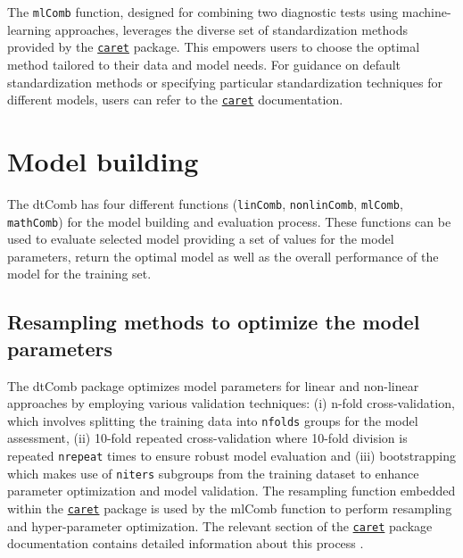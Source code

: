 \documentclass[10pt]{article}
\newcommand{\CRANpkg}[1]{\href{https://CRAN.R-project.org/package=#1}{\texttt{#1}}}
\newcommand{\Rfunction}[1]{\texttt{#1}}
\begin{document}
The \Rfunction{mlComb} function, designed for combining two diagnostic tests using machine-learning approaches, leverages the diverse set of standardization methods provided by the \CRANpkg{caret} package. This empowers users to choose the optimal method tailored to their data and model needs. For guidance on default standardization methods or specifying particular standardization techniques for different models, users can refer to the \CRANpkg{caret} documentation.
\section{Model building}
The dtComb has four different functions (\texttt{linComb}, \texttt{nonlinComb}, \texttt{mlComb}, \texttt{mathComb}) for the model building and evaluation process. These functions can be used to evaluate selected model providing a set of values for the model parameters, return the optimal model as well as the overall performance of the model for the training set.
\subsection{Resampling methods to optimize the model parameters}
The dtComb package optimizes model parameters for linear and non-linear approaches by employing various validation techniques: (i) n-fold cross-validation, which involves splitting the training data into \texttt{nfolds} groups for the model assessment, (ii) 10-fold repeated cross-validation where 10-fold division is repeated \texttt{nrepeat} times to ensure robust model evaluation and (iii) bootstrapping which makes use of \texttt{niters} subgroups from the training dataset to enhance parameter optimization and model validation. The resampling function embedded within the \CRANpkg{caret} package is used by the mlComb function to perform resampling and hyper-parameter optimization. The relevant section of the \CRANpkg{caret} package documentation contains detailed information about this process \citep{kuhn2008building}.
\end{document}
